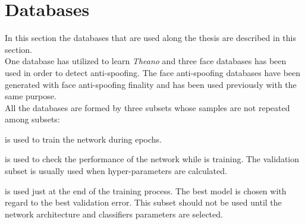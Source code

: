 \section{Databases}
In this section the databases that are used along the thesis are described in this section.\\

One database has utilized to learn \textit{Theano} and three face databases has been used in order to detect anti-spoofing. The face anti-spoofing databases have been generated with face anti-spoofing finality and has been used previously with the same purpose.\\

All the databases are formed by three subsets whose samples are not repeated among subsets:
\begin{description}[itemsep=2pt,topsep=8pt,parsep=0pt,partopsep=20pt]
\item[Training subset:] is used to train the network during epochs.
\item[Validation subset:] is used to check the performance of the network while is training. The validation subset is usually used when hyper-parameters are calculated.
\item[Test subset:] is used just at the end of the training process. The best model is chosen with regard to the best validation error. This subset should not be used until the network architecture and classifiers parameters are selected.
\end{description}


